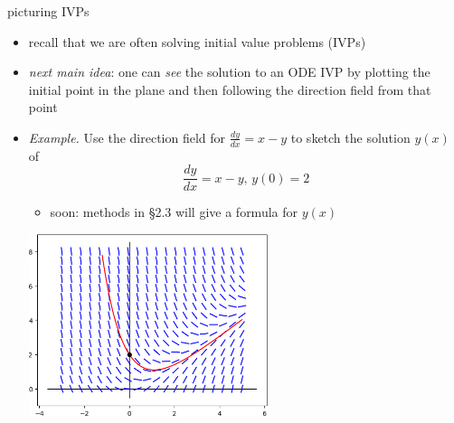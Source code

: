 \documentclass[colorlinks]{beamer}
\begin{document}
\begin{frame}{picturing IVPs}

\begin{itemize}
\item recall that we are often solving initial value problems (IVPs)
\item \emph{next main idea}:  one can \emph{see} the solution to an ODE IVP by plotting the initial point in the plane and then following the direction field from that point

\bigskip
\item \begin{minipage}[t]{0.32\textwidth} \small
\emph{Example.}  Use the direction field for
$\frac{dy}{dx} = x-y$ to sketch the solution $y(x)$ of
    $$\frac{dy}{dx} = x-y, \, y(0)=2$$

    \begin{itemize}
    \item soon: methods in \S 2.3 will give a formula for $y(x)$
    \end{itemize}
\end{minipage}

\vspace{-45mm}
\hfill \includegraphics[width=0.55\textwidth]{figs/example-field-solution}
\end{itemize}
\end{frame}
\end{document}
